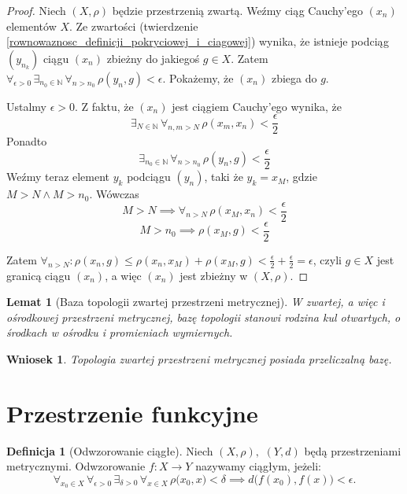 \documentclass[licencjacka]{pwr_wmat_praca_dyplomowa}
\theoremstyle{plain}
\numberwithin{theorem}{chapter}
\newtheorem{lemma}[theorem]{Lemat}
\newtheorem{corollary}[theorem]{Wniosek}
\theoremstyle{definition}
\numberwithin{theorem}{chapter}
\newtheorem{definition}[theorem]{Definicja}
\begin{document}
\begin{proof}
Niech $(X, \rho)$  będzie przestrzenią zwartą.
Weźmy ciąg Cauchy'ego $(x_n)$ elementów $X$. Ze zwartości (twierdzenie \ref{rownowaznosc_definicji_pokryciowej_i_ciagowej}) wynika, że istnieje podciąg $(y_{n_k})$ ciągu $(x_n)$ zbieżny do jakiegoś $g \in X$. Zatem $\forall_{\epsilon > 0} \, \exists_{n_0 \in \mathbb{N}} \, \forall_{n > n_0} \, \rho(y_n, g) < \epsilon$.
Pokażemy, że $(x_n)$ zbiega do $g$.

Ustalmy $\epsilon > 0$. Z faktu, że $(x_n)$ jest ciągiem Cauchy'ego wynika, że $$\exists_{N \in \mathbb{N}} \, \forall_{n, m > N} \, \rho(x_m, x_n) < \frac{\epsilon}{2}$$ Ponadto $$\exists_{n_0 \in \mathbb{N}} \, \forall_{n > n_0} \, \rho(y_n, g) < \frac{\epsilon}{2}$$ Weźmy teraz element $y_{k}$ podciągu $(y_n)$, taki że $y_{k} = x_M$, gdzie $M > N \land M > n_0$. Wówczas 
$$M > N \implies \forall_{n > N} \, \rho(x_M, x_n) < \frac{\epsilon}{2}$$
$$M > n_0 \implies \rho(x_M, g) < \frac{\epsilon}{2}$$

Zatem $\forall_{n > N}: \rho(x_n, g) \leq \rho(x_n, x_M) + \rho(x_M, g) < \frac{\epsilon}{2} + \frac{\epsilon}{2} = \epsilon$, czyli $g \in X$ jest granicą ciągu $(x_n)$, a więc $(x_n)$ jest zbieżny w $(X, \rho)$.
\end{proof}


\begin{lemma}[Baza topologii zwartej przestrzeni metrycznej]
W zwartej, a więc i ośrodkowej przestrzeni metrycznej, bazę topologii stanowi rodzina kul otwartych, o środkach w ośrodku i promieniach wymiernych.
\end{lemma}

\begin{corollary}
\label{istnieje_przeliczalna_baza_topologii}
Topologia zwartej przestrzeni metrycznej posiada przeliczalną bazę.
\end{corollary}




\section{Przestrzenie funkcyjne}

\begin{definition}[Odwzorowanie ciągłe]
Niech $(X, \rho),$ $(Y, d)$ będą przestrzeniami metrycznymi. Odwzorowanie $f: X \rightarrow Y$ nazywamy ciągłym, jeżeli:
$$\forall_{x_0 \in X} \, \forall_{\epsilon > 0} \, \exists_{\delta > 0} \, \forall_{x \in X} \, \rho\big(x_0, x\big) < \delta \implies d\big(f(x_0), f(x)\big) < \epsilon.$$
\end{definition}
\end{document}
